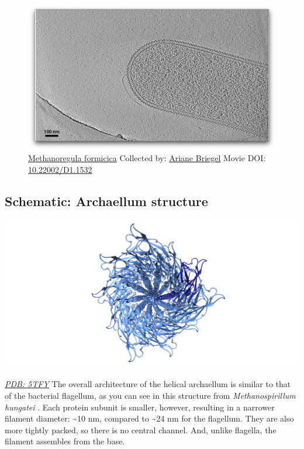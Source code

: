 \documentclass[]{tufte-book}
\begin{document}
\begin{figure}
\includegraphics{movie_stills/6_8} \caption[\protect\hyperlink{tree}{Methanoregula formicica} Collected
by: \protect\hyperlink{ariane_briegel}{Ariane Briegel} Movie DOI:
\href{https://doi.org/10.22002/D1.1532}{10.22002/D1.1532}]{\protect\hyperlink{tree}{Methanoregula formicica} Collected
by: \protect\hyperlink{ariane_briegel}{Ariane Briegel} Movie DOI:
\href{https://doi.org/10.22002/D1.1532}{10.22002/D1.1532}}\label{fig:6-8}
\end{figure}

\hypertarget{Archaellum_structure}{\subsection*{Schematic: Archaellum
structure}\label{Archaellum_structure}}

\includegraphics{img/schematics/6_8_1}

\href{http://rcsb.org/structure/5TFY}{\emph{PDB: 5TFY}} The overall
architecture of the helical archaellum is similar to that of the
bacterial flagellum, as you can see in this structure from
\emph{Methanospirillum hungatei} \citep{poweleit2016}. Each protein
subunit is smaller, however, resulting in a narrower filament diameter:
\textasciitilde{}10 nm, compared to \textasciitilde{}24 nm for the
flagellum. They are also more tightly packed, so there is no central
channel. And, unlike flagella, the filament assembles from the base.
\end{document}
